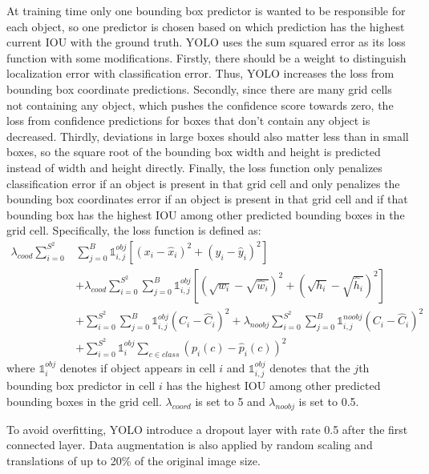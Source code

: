 At training time only one bounding box predictor is wanted to be responsible for each object, so one predictor is chosen based on which prediction has the highest current IOU with the ground truth. YOLO uses the sum squared error as its loss function with some modifications. Firstly, there should be a weight to distinguish localization error with classification error. Thus, YOLO increases the loss from bounding box coordinate predictions. Secondly, since there are many grid cells not containing any object, which pushes the confidence score towards zero, the loss from confidence predictions for boxes that don’t contain any object is decreased. Thirdly, deviations in large boxes should also matter less than in small boxes, so the square root of the bounding box width and height is predicted instead of width and height directly. Finally, the loss function only penalizes classification error if an object is present in that grid cell and only penalizes the bounding box coordinates error if an object is present in that grid cell and if that bounding box has the highest IOU among other predicted bounding boxes in the grid cell. Specifically, the loss function is defined as:
\begin{equation}
\begin{aligned}
 \lambda_{cood}\sum^{S^{2}}_{i=0}&\sum^{B}_{j=0}\mathbb{1}_{i,j}^{obj}\left[(x_{i} - \hat{x}_{i})^{2} + (y_{i} - \hat{y}_{i})^{2}\right]\\
  &+ \lambda_{cood}\sum^{S^{2}}_{i=0}\sum^{B}_{j=0}\mathbb{1}_{i,j}^{obj}\left[(\sqrt{w_{i}} - \sqrt{\hat{w}_{i}})^{2} + (\sqrt{h_{i}} - \sqrt{\hat{h}_{i}})^{2}\right]\\
   &+ \sum^{S^{2}}_{i=0}\sum^{B}_{j=0}\mathbb{1}_{i,j}^{obj}(C_{i} - \hat{C}_{i})^{2} +  \lambda_{noobj}\sum^{S^{2}}_{i=0}\sum^{B}_{j=0}\mathbb{1}_{i,j}^{noobj}(C_{i} - \hat{C}_{i})^{2}\\
    &+ \sum^{S^{2}}_{i=0}\mathbb{1}_{i}^{obj}\sum_{c\in{class}}(p_{i}(c) - \hat{p}_{i}(c))^{2}
\end{aligned}
\end{equation}
where $ \mathbb{1}_{i}^{obj} $ denotes if object appears in cell $ i $ and $ \mathbb{1}_{i,j}^{obj} $ denotes that the $j$th bounding box predictor in cell $ i $ has the highest IOU among other predicted bounding boxes in the grid cell. $ \lambda_{coord} $ is set to 5 and $ \lambda_{noobj} $ is set to 0.5.

To avoid overfitting, YOLO introduce a dropout layer with rate 0.5 after the first connected layer. Data augmentation is also applied by random scaling and translations of up to 20\% of the original image size.

